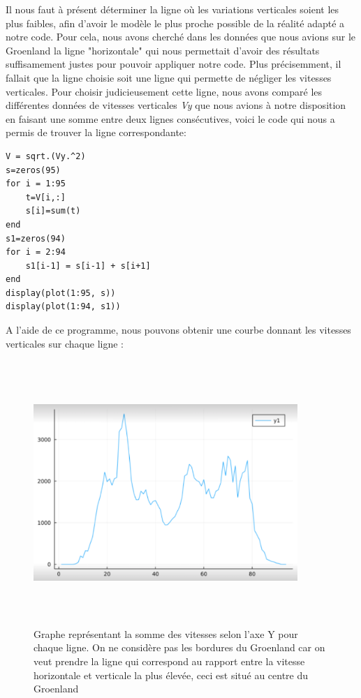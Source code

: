 \documentclass{article}
\begin{document}
\newpage
Il nous faut à présent déterminer la ligne où les variations verticales soient les plus faibles, afin d'avoir le modèle le plus proche possible de la réalité adapté a notre code.
\newline
Pour cela, nous avons cherché dans les données que nous avions sur le Groenland la ligne "horizontale" qui nous permettait d'avoir des résultats suffisamement justes pour pouvoir appliquer notre code. Plus précisemment, il fallait que la ligne choisie soit une ligne qui permette de négliger les vitesses verticales.
Pour choisir judicieusement cette ligne, nous avons comparé les différentes données de vitesses verticales \textit{Vy} que nous avions à notre disposition en faisant une somme entre deux lignes consécutives, voici le code qui nous a permis de trouver  la ligne correspondante: 
\begin{verbatim}
V = sqrt.(Vy.^2)
s=zeros(95)
for i = 1:95
    t=V[i,:]
    s[i]=sum(t)
end
s1=zeros(94)
for i = 2:94
    s1[i-1] = s[i-1] + s[i+1]
end
display(plot(1:95, s))
display(plot(1:94, s1))
\end{verbatim}
A l'aide de ce programme, nous pouvons obtenir une courbe donnant les vitesses verticales sur chaque ligne :
\begin{figure}[!htpb]
\centering
\includegraphics[width=10cm, keepaspectratio=true, height=10cm]{Vitesses.png}
\caption{Graphe représentant la somme des vitesses selon l'axe Y pour chaque ligne. On ne considère pas les bordures du Groenland car on veut prendre la ligne qui correspond au rapport entre la vitesse horizontale et verticale la plus élevée, ceci est situé au centre du Groenland }
\end{figure}
\end{document}

